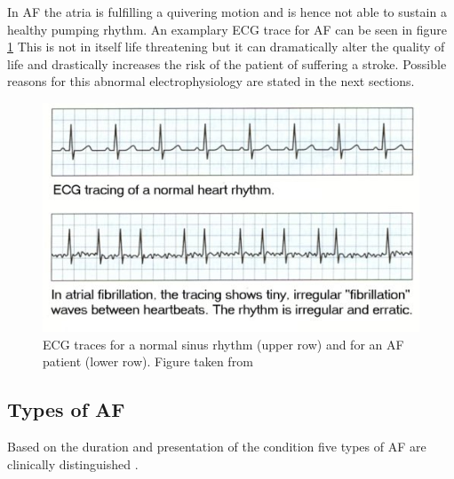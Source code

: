 \documentclass[type=dr, dr=rernat, accentcolor=tud7b,colorbacktitle, bigchapter, openright, twoside, 12pt ]{tudthesis}
\begin{document}
In AF the atria is fulfilling a quivering motion and is hence not able to sustain a healthy pumping rhythm. An examplary ECG trace for AF can be seen in figure \ref{af_ecg}
This is not in itself life threatening but it can dramatically alter the quality of life and drastically increases the risk of the patient of suffering a stroke. Possible reasons for this abnormal electrophysiology are stated in the next sections.

\begin{figure}[H]
\begin{center}
\includegraphics[scale=3]{AF_ECG.png}
\caption{ECG traces for a normal sinus rhythm (upper row) and for an AF patient (lower row). Figure taken from \cite{afib}}
\label{af_ecg}
\end{center}
\end{figure}

\newpage
\subsection*{Types of AF}

Based on the duration and presentation of the condition five types of AF are clinically distinguished \cite{ESC10} \cite{CE09}.
\end{document}
